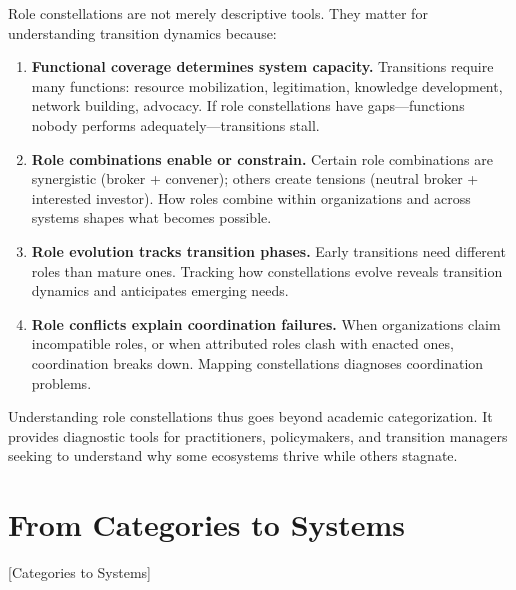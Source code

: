 \documentclass[../main.tex]{subfiles}
\begin{document}
Role constellations are not merely descriptive tools. They matter for understanding transition dynamics because:

\begin{enumerate}[leftmargin=*, itemsep=0.4em]
\item \textbf{Functional coverage determines system capacity.} Transitions require many functions: resource mobilization, legitimation, knowledge development, network building, advocacy. If role constellations have gaps---functions nobody performs adequately---transitions stall.

\item \textbf{Role combinations enable or constrain.} Certain role combinations are synergistic (broker + convener); others create tensions (neutral broker + interested investor). How roles combine within organizations and across systems shapes what becomes possible.

\item \textbf{Role evolution tracks transition phases.} Early transitions need different roles than mature ones. Tracking how constellations evolve reveals transition dynamics and anticipates emerging needs.

\item \textbf{Role conflicts explain coordination failures.} When organizations claim incompatible roles, or when attributed roles clash with enacted ones, coordination breaks down. Mapping constellations diagnoses coordination problems.
\end{enumerate}

Understanding role constellations thus goes beyond academic categorization. It provides diagnostic tools for practitioners, policymakers, and transition managers seeking to understand why some ecosystems thrive while others stagnate.


\section{From Categories to Systems}[Categories to Systems]
\end{document}
